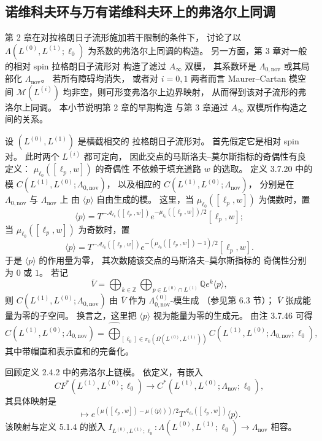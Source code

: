 
\subsection{诺维科夫环与万有诺维科夫环上的弗洛尔上同调}
\label{subsec:5-1-3}

第 2 章在对拉格朗日子流形施加若干限制的条件下，
讨论了以 $\Lambda(L^{(0)},L^{(1)};\ell_0)$
为系数的弗洛尔上同调的构造。
另一方面，第 3 章对一般的相对 spin 拉格朗日子流形对
构造了滤过 $A_\infty$ 双模，
其系数环是 $\Lambda_{0,\mathrm{nov}}$
或其局部化 $\Lambda_{\mathrm{nov}}$。
若所有障碍均消失，
或者对 $i=0,1$ 两者而言
Maurer--Cartan 模空间 $\mathcal M(L^{(i)})$
均非空，则可形变弗洛尔上边界映射，
从而得到该对子流形的弗洛尔上同调。
本小节说明第 2 章的早期构造
与第 3 章通过 $A_\infty$ 双模所作构造之间的关系。

设 $(L^{(0)},L^{(1)})$ 是横截相交的
拉格朗日子流形对。
首先假定它是相对 spin 对。
此时两个 $L^{(i)}$ 都可定向，
因此交点的马斯洛夫--莫尔斯指标的奇偶性有良定义：
$\mu_{\ell_0}([\ell_p,w])$ 的奇偶性
不依赖于填充道路 $w$ 的选取。
定义 3.7.20 中的模
$C(L^{(1)},L^{(0)};\Lambda_{0,\mathrm{nov}})$，
以及相应的
$C(L^{(1)},L^{(0)};\Lambda_{\mathrm{nov}})$，
分别是在 $\Lambda_{0,\mathrm{nov}}$
与 $\Lambda_{\mathrm{nov}}$ 上
由 $\langle p\rangle$ 自由生成的模。
这里，当 $\mu_{\ell_0}([\ell_p,w])$ 为偶数时，置
\[
\langle p\rangle
=T^{-\mathcal A_{\ell_0}([\ell_p,w])}
 e^{-\mu_{\ell_0}([\ell_p,w])/2}[\ell_p,w];
\]
当 $\mu_{\ell_0}([\ell_p,w])$ 为奇数时，置
\[
\langle p\rangle
=T^{-\mathcal A_{\ell_0}([\ell_p,w])}
 e^{-(\mu_{\ell_0}([\ell_p,w])-1)/2}[\ell_p,w].
\]
于是 $\langle p\rangle$ 的作用量为零，
其次数随该交点的马斯洛夫--莫尔斯指标的
奇偶性分别为 $0$ 或 $1$。
若记
\[
\overline V
=\bigoplus_{k\in\mathbb Z}
 \bigoplus_{p\in L^{(0)}\cap L^{(1)}}
 \mathbb Q e^k\langle p\rangle,
\]
则 $C(L^{(1)},L^{(0)};\Lambda_{0,\mathrm{nov}})$
由 $\overline V$ 作为
$\Lambda_{0,\mathrm{nov}}^{(0)}$-模生成
（参见第 6.3 节）；
$\overline V$ 张成能量为零的子空间。
换言之，这里把 $\langle p\rangle$
视为能量为零的生成元。
由注 3.7.46 可得
\[
C(L^{(1)},L^{(0)};\Lambda_{0,\mathrm{nov}})
=\widehat{\bigoplus}_{[\ell_0]\in
 \pi_0(\Omega(L^{(0)},L^{(1)}))}
C(L^{(1)},L^{(0)};
  \Lambda_{0,\mathrm{nov}};\ell_0),
\]
其中带帽直和表示直和的完备化。

回顾定义 2.4.2 中的弗洛尔上链模。
依定义，有嵌入
\begin{equation}
CF^*(L^{(1)},L^{(0)};\ell_0)
\longrightarrow
C^*(L^{(1)},L^{(0)};\Lambda_{\mathrm{nov}};\ell_0),
\tag{5.1.15.1}\label{eq:5-1-15-1}
\end{equation}
其具体映射是
\begin{equation}
[\ell_p,w]\longmapsto
e^{(\mu([\ell_p,w])-\mu(\langle p\rangle))/2}
T^{\mathcal A_{\ell_0}([\ell_p,w])}
\langle p\rangle.
\tag{5.1.15.2}\label{eq:5-1-15-2}
\end{equation}
该映射与定义 5.1.4 的嵌入
$I_{L^{(0)},L^{(1)};\ell_0}:
\Lambda(L^{(0)},L^{(1)};\ell_0)
\to\Lambda_{\mathrm{nov}}$ 相容。

